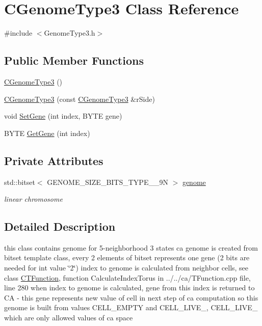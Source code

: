 \hypertarget{classCGenomeType3}{
\section{CGenomeType3 Class Reference}
\label{classCGenomeType3}
}


{\ttfamily \#include $<$GenomeType3.h$>$}\subsection*{Public Member Functions}
\begin{DoxyCompactItemize}
\item 
\hyperlink{classCGenomeType3_a4bf9f000ce756d3203a754f7eaf29634}{CGenomeType3} ()
\item 
\hyperlink{classCGenomeType3_a6175c7fcb882b942df799420b7b86f66}{CGenomeType3} (const \hyperlink{classCGenomeType3}{CGenomeType3} \&rSide)
\item 
void \hyperlink{classCGenomeType3_a3d0626b0e86222aa39563642530d7ab0}{SetGene} (int index, BYTE gene)
\item 
BYTE \hyperlink{classCGenomeType3_af6f7a0271f5b93dbf23f030b3cb7781f}{GetGene} (int index)
\end{DoxyCompactItemize}
\subsection*{Private Attributes}
\begin{DoxyCompactItemize}
\item 
\hypertarget{classCGenomeType3_a991ab79797ffedd41e87551b6e6036e0}{
std::bitset$<$ GENOME\_\-SIZE\_\-BITS\_\-TYPE\_\_\-9N $>$ \hyperlink{classCGenomeType3_a991ab79797ffedd41e87551b6e6036e0}{genome}}
\label{classCGenomeType3_a991ab79797ffedd41e87551b6e6036e0}

\begin{DoxyCompactList}\small\item\em linear chromosome \item\end{DoxyCompactList}\end{DoxyCompactItemize}


\subsection{Detailed Description}
this class contains genome for 5-\/neighborhood 3 states ca genome is created from bitset template class, every 2 elements of bitset represents one gene (2 bits are needed for int value \char`\"{}2\char`\"{}) index to genome is calculated from neighbor cells, see class \hyperlink{classCTFunction}{CTFunction}, function CalculateIndexTorus in ../../ca/TFunction.cpp file, line 280 when index to genome is calculated, gene from this index is returned to CA -\/ this gene represents new value of cell in next step of ca computation so this genome is built from values CELL\_\-EMPTY and CELL\_\-LIVE\_, CELL\_\-LIVE\_ which are only allowed values of ca space 

